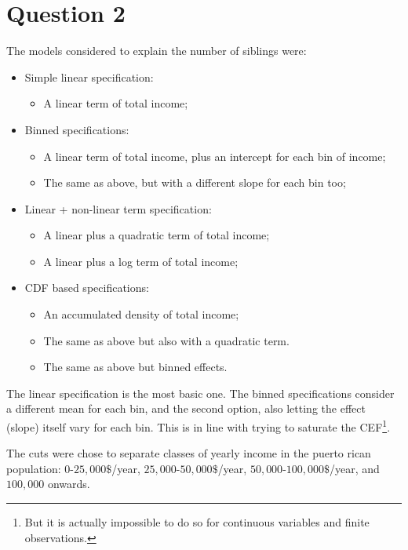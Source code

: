\documentclass[12pt]{article}
\begin{document}
\section*{Question 2}
The models considered to explain the number of siblings were:

\begin{itemize}[itemsep=-0.5em]
    \item Simple linear specification:
    \begin{itemize}
        \item A linear term of total income;
    \end{itemize}
    \item Binned specifications:
    \begin{itemize}
        \item A linear term of total income, plus an intercept for each bin of income;
        \item The same as above, but with a different slope for each bin too;
    \end{itemize}
    \item Linear + non-linear term specification:
    \begin{itemize}
        \item A linear plus a quadratic term of total income;
        \item A linear plus a log term of total income;
    \end{itemize}
    \item CDF based specifications:
    \begin{itemize}
        \item An accumulated density of total income;
        \item The same as above but also with a quadratic term.
        \item The same as above but binned effects.
    \end{itemize}
\end{itemize}

The linear specification is the most basic one. The binned specifications consider a different mean for each bin, and the second option, also letting the effect (slope) itself vary for each bin. This is in line with trying to saturate the CEF\footnote{But it is actually impossible to do so for continuous variables and finite observations.}.

The cuts were chose to separate classes of yearly income in the puerto rican population: $0$-$25,000\$$/year, $25,000$-$50,000\$$/year, $50,000$-$100,000\$$/year, and $100,000$ onwards.
\end{document}
